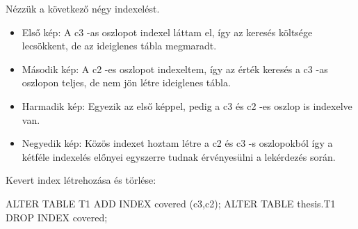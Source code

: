 Nézzük a következő négy indexelést.
\begin{itemize} 
\item Első kép: A c3 -as oszlopot indexel láttam el, így az keresés költsége lecsökkent, de az ideiglenes tábla megmaradt.
\item Második kép: A c2 -es oszlopot indexeltem, így az érték keresés a c3 -as oszlopon teljes, de nem jön létre ideiglenes tábla.
\item Harmadik kép: Egyezik az első képpel, pedig a c3 és c2 -es oszlop is indexelve van.
\item Negyedik kép: Közös indexet hoztam létre a c2 és c3 -s oszlopokból így a kétféle indexelés előnyei egyszerre tudnak érvényesülni a lekérdezés során.
\end{itemize} 
Kevert index létrehozása és törlése:
\begin{python}
ALTER TABLE T1 ADD INDEX covered (c3,c2);
ALTER TABLE thesis.T1 DROP INDEX covered;
\end{python}




